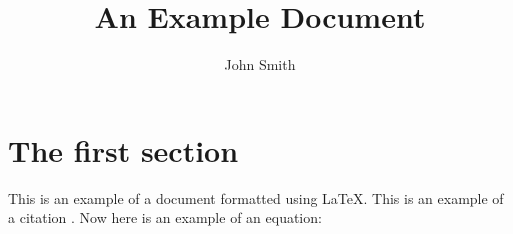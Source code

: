\documentclass[12pt]{article}
\title{An Example Document}
\author{John Smith}
\date{}
\begin{document}
\maketitle

\section{The first section}

This is an example of a document formatted using \LaTeX{}.
This is an example of a citation \cite{dirac}.
Now here is an example of an equation:


% 

% 
\end{document}

